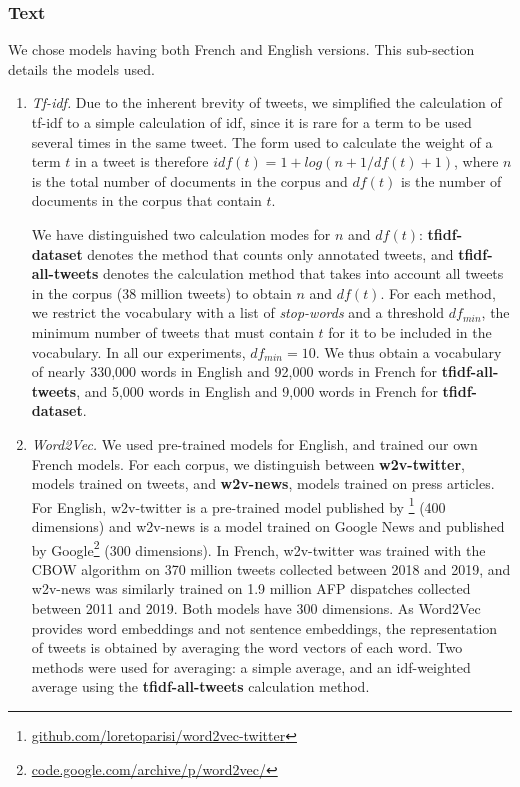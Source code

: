 \subsubsection{Text}
\label{Subsubsec: text}
We chose models having both French and English versions. This sub-section details the models used.

\begin{enumerate}
    \item \textit{Tf-idf.} Due to the inherent brevity of tweets, we simplified the calculation of tf-idf to a simple calculation of idf, since it is rare for a term to be used several times in the same tweet. The form used to calculate the weight of a term $t$ in a tweet is therefore $idf(t) = 1 + log(n+1/df(t)+1)$, where $n$ is the total number of documents in the corpus and $df(t)$ is the number of documents in the corpus that contain $t$.
    
We have distinguished two calculation modes for $n$ and $df(t)$: \textbf{tfidf-dataset} denotes the method that counts only annotated tweets, and \textbf{tfidf-all-tweets} denotes the calculation method that takes into account all tweets in the corpus (38 million tweets) to obtain $n$ and $df(t)$. For each method, we restrict the vocabulary with a list of \textit{stop-words} and a threshold $df_{min}$, the minimum number of tweets that must contain $t$ for it to be included in the vocabulary. In all our experiments, $df_{min}=10$. We thus obtain a vocabulary of nearly 330,000 words in English and 92,000 words in French for \textbf{tfidf-all-tweets}, and 5,000 words in English and 9,000 words in French for \textbf{tfidf-dataset}.

\item \textit{Word2Vec.} We used pre-trained models for English, and trained our own French models. For each corpus, we distinguish between \textbf{w2v-twitter}, models trained on tweets, and \textbf{w2v-news}, models trained on press articles. For English, w2v-twitter is a pre-trained model published by \citet{godin2015multimedia}\footnote{\url{github.com/loretoparisi/word2vec-twitter}} (400 dimensions) and w2v-news is a model trained on Google News and published by Google\footnote{\url{code.google.com/archive/p/word2vec/}}  (300 dimensions). In French, w2v-twitter was trained with the CBOW algorithm on 370 million tweets collected between 2018 and 2019, and w2v-news was similarly trained on 1.9 million AFP dispatches collected between 2011 and 2019. Both models have 300 dimensions.
As Word2Vec provides word embeddings and not sentence embeddings, the representation of tweets is obtained by averaging the word vectors of each word. Two methods were used for averaging: a simple average, and an idf-weighted average using the \textbf{tfidf-all-tweets} calculation method.


\end{enumerate}
